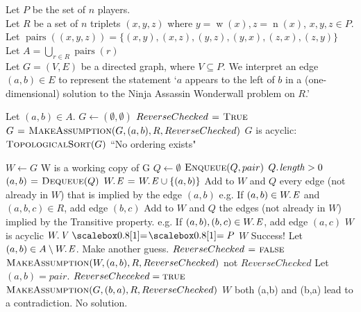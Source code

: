 \documentclass{article}
\DeclareMathOperator{\w}{w}
\DeclareMathOperator{\n}{n}
\DeclareMathOperator{\pairs}{pairs}
\begin{document}
Let $P$ be the set of $n$ players.\\
Let $R$ be a set of $n$ triplets $(x,y,z)$ where $y=\w(x), z=\n(x)$, $x,y,z \in P$. \\ %
Let $\pairs((x,y,z)) = \{(x,y),(x,z),(y,z),(y,x),(z,x),(z,y)\}$\\
Let $A = \bigcup\limits_{r\in R} \pairs(r)$\\
Let $G = (V,E)$ be a directed graph, where $V \subseteq P$. We interpret an edge $(a,b) \in E$ to represent the statement `$a$ appears to the left of $b$ in a (one-dimensional) solution to the Ninja Assassin Wonderwall problem on $R$.' \\

\begin{codebox}
\li Let $(a,b) \in A$. 
\li $G \gets (\emptyset, \emptyset)$
\li $ReverseChecked \mathrel{\hspace{1pt}=\hspace{1pt}} \textnormal{\scshape True}$
\li $G \mathrel{\hspace{1pt}=\hspace{1pt}} \textnormal{\scshape MakeAssumption}(G, (a,b), R, ReverseChecked)$
\li \If $G$ is acyclic:
\li \Do
         $\textnormal{\scshape TopologicalSort}(G)$
\li \Else
         ``No ordering exists"
    \End
\end{codebox}

\begin{codebox}
\li $W \gets G$ \Comment W is a working copy of G
\li $Q \gets \emptyset$
\li $\textnormal{\scshape Enqueue}(Q,pair)$
\li \While $\attrib{Q}{length} > 0$ 
\li \Do
        $(a,b) \mathrel{\hspace{1pt}=\hspace{1pt}} \textnormal{\scshape Dequeue}(Q)$
\li     $\attrib{W}{E} \gets \attrib{W}{E} \cup \{(a,b)\}$
\li     Add to $W$ and $Q$ every edge (not already in $W$) that is implied by the edge $(a,b)$
\zi  \Comment e.g. If $(a,b) \in \attrib{W}{E}$ and $(a,b,c) \in R$, add edge $(b,c)$
\li     Add to $W$ and $Q$ the edges (not already in $W$) implied by the Transitive property.
\zi  \Comment e.g. If $(a,b),(b,c) \in \attrib{W}{E}$, add edge $(a,c)$
    \End %
\li \If $W$ is acyclic
\li \Do
        \If $\attrib{W}{V} \isequal P$
\li     \Do
            \Return $W$ \Comment Success!
\li        \Else
\li         Let $(a,b) \in A \setminus \attrib{W}{E}$. \Comment Make another guess.
\li         $ReverseChecked \mathrel{\hspace{1pt}=\hspace{1pt}} \textnormal{\scshape false}$
\li         \Return $\textnormal{\scshape MakeAssumption}(W,(a,b), R, ReverseChecked)$
        \End
\li \ElseIf not $ReverseChecked$
\li \Do
        Let $(a,b) = pair$.
\li     $ReverseCheceked = \textnormal{\scshape true}$
\li     \Return $\textnormal{\scshape MakeAssumption}(G, (b,a), R, ReverseChecked)$
\li \Else
        \Return $W$ \Comment both (a,b) and (b,a) lead to a contradiction. No solution.
    \End
\end{codebox} 
\end{document}
